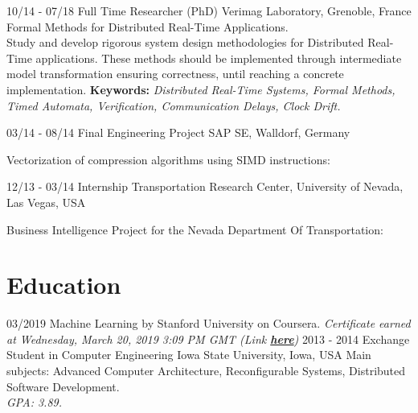 \documentclass[]{friggeri-cv}
\begin{document}
\begin{entrylist}
{\begin{itemize}
        \end{itemize}
    }
  \entry
    {10/14 - 07/18}
    {Full Time Researcher (PhD)}
    {Verimag Laboratory, Grenoble, France}
    {Formal Methods for Distributed Real-Time Applications.\\
    Study and develop rigorous system design methodologies for Distributed Real-Time applications. These methods should be implemented through intermediate model transformation
    ensuring correctness, until reaching a concrete implementation.
    \newline \textbf{Keywords:} \emph{Distributed Real-Time Systems, Formal Methods, Timed Automata, Verification, Communication Delays, Clock Drift.}\\
  }

  \entry
    {03/14 - 08/14}
    {Final Engineering Project}
    {SAP SE, Walldorf, Germany}
    {Vectorization of compression algorithms using SIMD instructions:
        \begin{itemize}
        \end{itemize}
    }
\end{entrylist}
\newpage
\makeprofile
\begin{entrylist}
  \entry
    {12/13 - 03/14}
    {Internship}
    {Transportation Research Center, University of Nevada, Las Vegas, USA}
    {Business Intelligence Project for the Nevada Department Of Transportation:
        \begin{itemize}
        \end{itemize}
    }
   
\end{entrylist}
\section{Education}
  \begin{entrylist}
  \entry
    {03/2019}
    {Machine Learning by Stanford University on Coursera.}
    {}
    {\emph{Certificate earned at Wednesday, March 20, 2019 3:09 PM GMT (Link \href{https://www.coursera.org/account/accomplishments/certificate/XAWSYCH46GSE}{\textbf{here}})}}
  \entry
    {2013 - 2014}
    {Exchange Student in Computer Engineering}
    {Iowa State University, Iowa, USA}
    {Main subjects: Advanced Computer Architecture, Reconfigurable Systems, Distributed Software Development.\\
    \emph{GPA: 3.89.}\\}
\end{entrylist}
\end{document}
